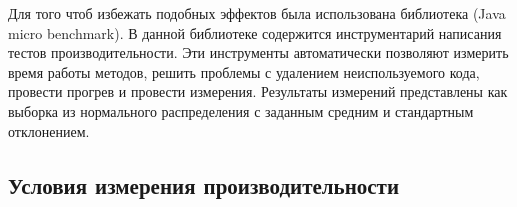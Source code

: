 Для того чтоб избежать подобных эффектов была использована библиотека \cite{jmh}(Java micro benchmark). В данной библиотеке содержится инструментарий написания тестов производительности. Эти инструменты автоматически позволяют измерить время работы методов, решить проблемы с удалением неиспользуемого кода, провести прогрев и провести измерения. Результаты измерений представлены как выборка из нормального распределения с заданным средним и стандартным отклонением.

\subsection{Условия измерения производительности}
